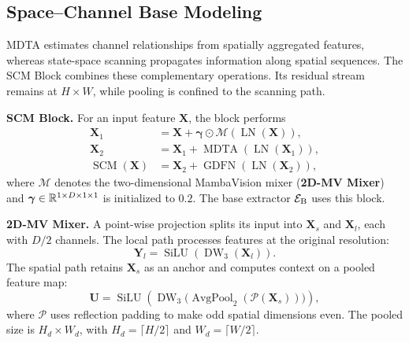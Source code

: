 \subsection{Space--Channel Base Modeling}\label{subsec:mamba_branch}
MDTA estimates channel relationships from spatially aggregated features, whereas state-space scanning propagates information along spatial sequences. The SCM Block combines these complementary operations. Its residual stream remains at $H\times W$, while pooling is confined to the scanning path.

\textbf{SCM Block.}
For an input feature $\mathbf X$, the block performs
\begin{equation}
\begin{aligned}
 \mathbf X_1&=\mathbf X+\boldsymbol\gamma\odot\mathcal M(\operatorname{LN}(\mathbf X)),\\
 \mathbf X_2&=\mathbf X_1+\operatorname{MDTA}(\operatorname{LN}(\mathbf X_1)),\\
 \operatorname{SCM}(\mathbf X)&=\mathbf X_2+\operatorname{GDFN}(\operatorname{LN}(\mathbf X_2)),
\end{aligned}\label{eq:scm}
\end{equation}
where $\mathcal M$ denotes the two-dimensional MambaVision mixer (\textbf{2D-MV Mixer}) and $\boldsymbol\gamma\in\mathbb{R}^{1\times D\times1\times1}$ is initialized to $0.2$. The base extractor $\mathcal{E}_{\text{B}}$ uses this block.

\textbf{2D-MV Mixer.}
A point-wise projection splits its input into $\mathbf X_s$ and $\mathbf X_l$, each with $D/2$ channels. The local path processes features at the original resolution:
\begin{equation}
 \mathbf Y_l=\operatorname{SiLU}(\operatorname{DW}_{3}(\mathbf X_l)).
\end{equation}
The spatial path retains $\mathbf X_s$ as an anchor and computes context on a pooled feature map:
\begin{equation}
 \mathbf U=\operatorname{SiLU}\!\left(\operatorname{DW}_{3}
 \big(\operatorname{AvgPool}_{2}(\mathcal P(\mathbf X_s))\big)\right),
\end{equation}
where $\mathcal P$ uses reflection padding to make odd spatial dimensions even. The pooled size is $H_d\times W_d$, with $H_d=\lceil H/2\rceil$ and $W_d=\lceil W/2\rceil$.

